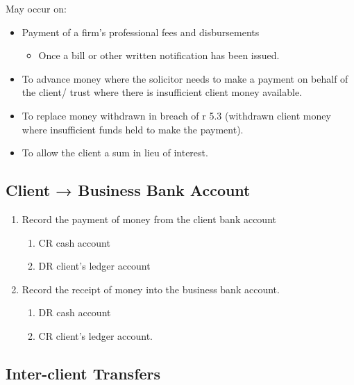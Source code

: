 \documentclass[
]{article}
\providecommand{\tightlist}{%
  \setlength{\itemsep}{0pt}\setlength{\parskip}{0pt}}
\begin{document}
May occur on:

\begin{itemize}
\tightlist
\item
  Payment of a firm's professional fees and disbursements

  \begin{itemize}
  \tightlist
  \item
    Once a bill or other written notification has been issued.
  \end{itemize}
\item
  To advance money where the solicitor needs to make a payment on behalf
  of the client/ trust where there is insufficient client money
  available.
\item
  To replace money withdrawn in breach of r 5.3 (withdrawn client money
  where insufficient funds held to make the payment).
\item
  To allow the client a sum in lieu of interest.
\end{itemize}

\hypertarget{client-business-bank-account}{%
\subsection{Client → Business Bank
Account}\label{client-business-bank-account}}

\begin{enumerate}
\def\labelenumi{\arabic{enumi}.}
\tightlist
\item
  Record the payment of money from the client bank account

  \begin{enumerate}
  \def\labelenumii{\arabic{enumii}.}
  \tightlist
  \item
    CR cash account
  \item
    DR client's ledger account
  \end{enumerate}
\item
  Record the receipt of money into the business bank account.

  \begin{enumerate}
  \def\labelenumii{\arabic{enumii}.}
  \tightlist
  \item
    DR cash account
  \item
    CR client's ledger account.
  \end{enumerate}
\end{enumerate}

\hypertarget{inter-client-transfers}{%
\subsection{Inter-client Transfers}\label{inter-client-transfers}}
\end{document}
